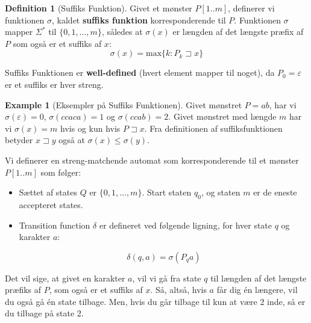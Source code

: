 \documentclass[11pt]{article}
\theoremstyle{definition}
\newtheorem{definition}{Definition}
\newtheorem{example}{Example}
\theoremstyle{remark}
\begin{document}
\begin{definition}[Suffiks Funktion]
  Givet et mønster $P[1..m]$, definerer vi funktionen $\sigma$, kaldet \textbf{suffiks funktion} korresponderende til $P$. Funktionen $\sigma$ mapper $\Sigma^{*}$ til $\{0,1, \ldots, m\}$, således at $\sigma(x)$ er længden af det længste præfix af $P$ som også er et suffiks af $x$:
  \[ \sigma(x) = \text{max}\{k : P_{k} \sqsupset x\} \]

  Suffiks Funktionen  er \textbf{well-defined} (hvert element mapper til noget), da $P_{0} = \varepsilon$ er et suffiks er hver streng. 
\end{definition}

\begin{example}[Eksempler på Suffiks Funktionen]

  Givet mønstret $P = ab$, har vi $\sigma(\varepsilon) = 0$, $\sigma(ccaca) = 1$ og $\sigma(ccab) = 2$.
  Givet mønstret med længde $m$ har vi $\sigma(x) = m$ hvis og kun hvis $P \sqsupset x$. Fra definitionen af suffiksfunktionen betyder $x \sqsupset y$ også at $\sigma(x) \leq \sigma(y)$.
\end{example}

Vi definerer en streng-matchende automat som korresponderende til et mønster $P[1..m]$ som følger:

\begin{itemize}
\item Sættet af states $Q$ er $\{0, 1, \ldots, m\}$. Start staten $q_{0}$, og staten $m$ er de eneste accepteret states. 
\item Transition function $\delta$ er defineret ved følgende ligning, for hver state $q$ og karakter $a$:

  \begin{equation}
    \label{32.4}
\delta(q,a) = \sigma(P_{q}a)
  \end{equation}
  
\end{itemize}

Det vil sige, at givet en karakter $a$, vil vi gå fra state $q$ til længden af det længste præfiks af $P$, som også er et suffiks af $x$. Så, altså, hvis $a$ får dig én længere, vil du også gå én state tilbage. Men, hvis du går tilbage til kun at være 2 inde, så er du tilbage på state 2. 
\end{document}
